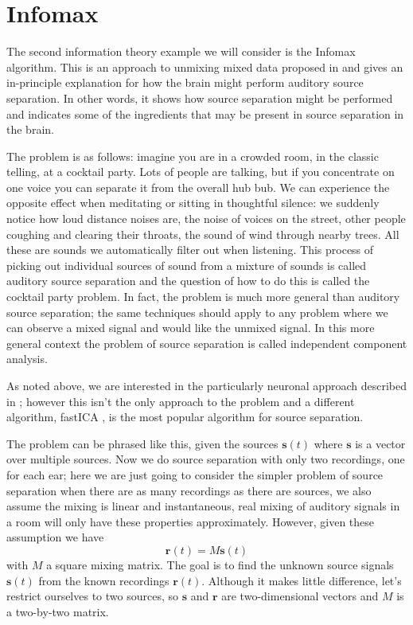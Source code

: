 \documentclass[12pt]{article}
\begin{document}
\section*{Infomax}

The second information theory example we will consider is the Infomax
algorithm. This is an approach to unmixing mixed data proposed in
\cite{BellSejnowski1995} and gives an in-principle explanation for how
the brain might perform auditory source separation. In other words, it
shows how source separation might be performed and indicates some of
the ingredients that may be present in source separation in the brain.

The problem is as follows: imagine you are in a crowded room, in the
classic telling, at a cocktail party. Lots of people are talking, but
if you concentrate on one voice you can separate it from the overall
hub bub. We can experience the opposite effect when meditating or
sitting in thoughtful silence: we suddenly notice how loud distance
noises are, the noise of voices on the street, other people coughing
and clearing their throats, the sound of wind through nearby
trees. All these are sounds we automatically filter out when
listening. This process of picking out individual sources of sound
from a mixture of sounds is called auditory source separation and the
question of how to do this is called the cocktail party problem. In
fact, the problem is much more general than auditory source
separation; the same techniques should apply to any problem where we
can observe a mixed signal and would like the unmixed signal. In this
more general context the problem of source separation is called
independent component analysis.

As noted above, we are interested in the particularly neuronal
approach described in \cite{BellSejnowski1995}; however this isn't the
only approach to the problem and a different algorithm, fastICA
\citep{Hyvarinen1999}, is the most popular algorithm for source separation.

The problem can be phrased like this, given the sources
$\textbf{s}(t)$ where $\textbf{s}$ is a vector over multiple
sources. Now we do source separation with only two recordings, one for
each ear; here we are just going to consider the simpler problem of
source separation when there are as many recordings as there are
sources, we also assume the mixing is linear and instantaneous, real
mixing of auditory signals in a room will only have these properties
approximately. However, given these assumption we have
\begin{equation} \mathbf{r}(t)=M\mathbf{s}(t) \end{equation} with $M$
a square mixing matrix. The goal is to find the unknown source signals
$\textbf{s}(t)$ from the known recordings $\textbf{r}(t)$. Although it
makes little difference, let's restrict ourselves to two sources, so
$\mathbf{s}$ and $\mathbf{r}$ are two-dimensional vectors and $M$ is a
two-by-two matrix.
\end{document}
